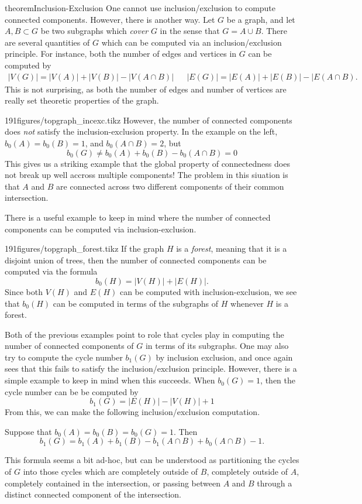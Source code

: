 \begin{doubledpage}{theorem}{Inclusion-Exclusion}{
	One cannot use inclusion/exclusion to compute connected components. However, there is another way.  }
\label{graph:thm:mengers}
Let $G$ be a graph, and let $A, B\subset G$ be two subgraphs which \emph{cover} $G$ in the sense that $G=A\cup B$. There are several quantities of $G$ which can be computed via an inclusion/exclusion principle.
For instance, both the number of edges and vertices in $G$ can be computed by 
\begin{align*}
|V(G)|=|V(A)|+|V(B)|-|V(A\cap B)| && |E(G)|=|E(A)|+|E(B)|-|E(A\cap B).
\end{align*}
This is not surprising, as both the number of edges and number of vertices are really set theoretic properties of the graph. 
\begin{paragraphfigureenv}{191figures/topgraph_incexc.tikz}
However, the number of connected components does \emph{not} satisfy the inclusion-exclusion property. In the example on the left, $b_0(A)=b_0(B)=1$, and $b_0(A\cap B)=2$, but
\[b_0(G)\neq b_0(A)+b_0(B)-b_0(A\cap B)=0\]
This gives us a striking example that the global property of connectedness does not break up well accross multiple components! The problem in this siuation is that $A$ and $B$ are connected across two different components of their common intersection.
\end{paragraphfigureenv}
There is a useful example to keep in mind where the number of connected components can be computed via inclusion-exclusion.
\begin{paragraphfigureenv}{191figures/topgraph_forest.tikz}
If the graph $H$ is a \emph{forest}, meaning that it is a disjoint union of trees, then the number of connected components can be computed via the formula
\[b_0(H)=|V(H)|+|E(H)|.\]
Since both $V(H)$ and $E(H)$ can be computed with inclusion-exclusion, we see that $b_0(H)$ can be computed in terms of the subgraphs of $H$ whenever $H$ is a forest.
\end{paragraphfigureenv}
Both of the previous examples point to role that cycles play in computing the number of connected components of $G$ in terms of its subgraphs.
One may also try to compute the cycle number $b_1(G)$ by inclusion exclusion, and once again sees that this fails to satisfy the inclusion/exclusion principle. However, there is a simple example to keep in mind when this succeeds. 
When $b_0(G)=1$, then the cycle number can be be computed by 
\[b_1(G)=|E(H)|-|V(H)|+1\]
From this, we can make the following inclusion/exclusion computation.
\begin{claim}
Suppose that $b_0(A)=b_0(B)=b_0(G)=1$. Then 
\[
	b_1(G)=b_1(A)+b_1(B)-b_1(A\cap B)+b_0(A\cap B)-1.
\]
\end{claim}
This formula seems a bit ad-hoc, but can be understood as partitioning the cycles of $G$ into those cycles which are completely outside of $B$, completely outside of $A$, completely contained in the intersection, or passing between $A$ and $B$ through a distinct connected component of the intersection. 


\end{doubledpage}
